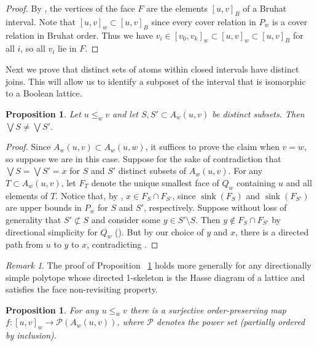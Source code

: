 \documentclass[12pt]{amsart}
\theoremstyle{plain}
\newtheorem{prop}[thm]{Proposition}
\theoremstyle{definition}
\theoremstyle{remark}
\newtheorem{remark}[thm]{Remark}
\DeclareMathOperator{\sink}{sink}
\begin{document}
\begin{proof}
By , the vertices of the face $F$ are the elements $[u,v]_B$ of a Bruhat interval. Note that $[u,v]_w \subset [u,v]_B$ since every cover relation in $P_w$  is a cover relation in Bruhat order. Thus we have $v_i \in [v_0,v_k]_w \subset [u,v]_w \subset [u,v]_B$ for all $i$, so all $v_i$ lie in $F$.
\end{proof}

Next we prove that distinct sets of atoms within closed intervals have distinct joins.  This will allow us to identify a subposet of the interval that is isomorphic to a Boolean lattice.

\begin{prop}\label{prop:distinct-joins}
Let $u \leq_w v$ and let $S,S' \subset A_w(u,v)$ be distinct subsets. Then $\bigvee S \neq \bigvee S'$. 
\end{prop}
\begin{proof}
Since $A_w(u,v) \subset A_w(u,w)$, it suffices to prove the claim when $v=w$, so suppose we are in this case. Suppose for the sake of contradiction that $\bigvee S = \bigvee S' = x$ for $S$ and  $S'$ distinct subsets of $A_w(u,v)$.  For any $T \subset A_w(u,v)$, let $F_T$ denote the unique smallest face of $Q_w$ containing $u$ and all elements of $T$. Notice that, by , $x \in F_S \cap F_{S'}$, since $\sink(F_S)$ and $\sink(F_{S'})$ are upper bounds in $P_w$ for $S$ and $S'$, respectively. Suppose without loss of generality that $S' \not \subset S$ and consider some $y \in S' \setminus S$.  Then $y\not\in F_S \cap F_{S'}$ by directional simplicity for $Q_w$ ().  But by our choice of $y$ and $x$, there is a directed path from $u$ to $y$ to $x$, contradicting .
\end{proof}

\begin{remark}
The proof of Proposition ~\ref{prop:distinct-joins} holds more generally for any directionally simple polytope whose directed 1-skeleton is the Hasse diagram of a lattice and satisfies the face non-revisiting property.  
\end{remark}

\begin{prop}\label{prop:surjective-poset-map}
For any $u \leq_w v$ there is a surjective order-preserving map $f:[u,v]_w \rightarrow \mathcal{P}(A_w(u,v))$, where $\mathcal{P}$ denotes the power set (partially ordered by inclusion).
\end{prop}
\end{document}
